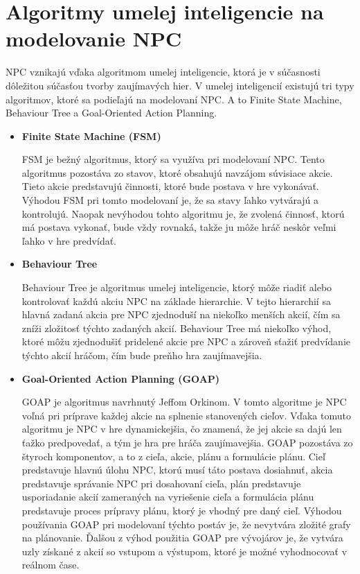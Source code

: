 \documentclass[10pt,twoside,slovak,a4paper]{article}
\begin{document}
\section{Algoritmy umelej inteligencie na modelovanie NPC} 
NPC vznikajú vďaka algoritmom umelej inteligencie, ktorá je v súčasnosti dôležitou súčasťou tvorby zaujímavých hier. V umelej inteligencií existujú tri typy algoritmov, ktoré sa podieľajú na modelovaní NPC. A to Finite State Machine, Behaviour Tree a Goal-Oriented Action Planning.  
\begin{itemize}
\item \textbf{Finite State Machine (FSM)}

 FSM je bežný algoritmus, ktorý sa využíva pri modelovaní NPC. Tento algoritmus pozostáva zo stavov, ktoré obsahujú navzájom súvisiace akcie. Tieto akcie predstavujú činnosti, ktoré bude postava v hre vykonávať. Výhodou FSM pri tomto modelovaní je, že sa stavy ľahko vytvárajú a kontrolujú. Naopak nevýhodou tohto algoritmu je, že zvolená činnosť, ktorú má postava vykonať, bude vždy rovnaká, takže ju môže hráč neskôr veľmi ľahko v hre predvídať. \cite{NPC}


\item \textbf{Behaviour Tree}

 Behaviour Tree je algoritmus umelej inteligencie, ktorý môže riadiť alebo kontrolovať každú akciu NPC na základe hierarchie. V tejto hierarchií sa hlavná zadaná akcia pre NPC zjednoduší na niekoľko menších akcií, čím sa zníži zložitosť týchto zadaných akcií. Behaviour Tree má niekoľko výhod, ktoré môžu zjednodušiť pridelené akcie pre NPC a zároveň sťažiť predvídanie týchto akcií hráčom, čím bude preňho hra zaujímavejšia.   \cite{NPC}

\item \textbf{Goal-Oriented Action Planning (GOAP)}

 GOAP je algoritmus navrhnutý Jeffom Orkinom. V tomto algoritme je NPC voľná pri príprave každej akcie na splnenie stanovených cieľov. Vďaka tomuto algoritmu je NPC v hre dynamickejšia, čo znamená, že jej akcie sa dajú len ťažko predpovedať, a tým je hra pre hráča zaujímavejšia. GOAP pozostáva zo štyroch komponentov, a to z cieľa, akcie, plánu a formulácie plánu. Cieľ predstavuje hlavnú úlohu NPC, ktorú musí táto postava dosiahnuť, akcia predstavuje správanie NPC pri dosahovaní cieľa, plán predstavuje usporiadanie akcií zameraných na vyriešenie cieľa a formulácia plánu predstavuje proces prípravy plánu, ktorý je vhodný pre daný cieľ.  Výhodou používania GOAP pri modelovaní týchto postáv je, že nevytvára zložité grafy na plánovanie. Ďalšou z výhod použitia GOAP pre vývojárov je, že vytvára uzly získané z akcií so vstupom a výstupom, ktoré je možné vyhodnocovať v reálnom čase.   \cite{NPC}

\end{itemize}
\end{document}

